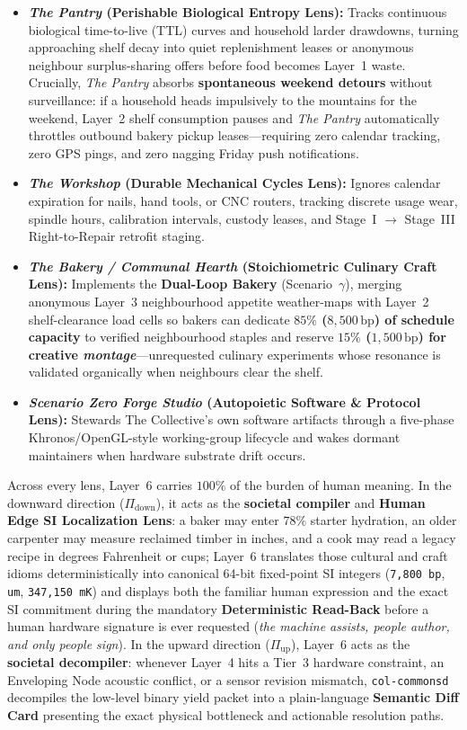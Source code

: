 \begin{itemize}
  \item \textbf{\textit{The Pantry} (Perishable Biological Entropy Lens):} Tracks continuous biological time-to-live (TTL) curves and household larder drawdowns, turning approaching shelf decay into quiet replenishment leases or anonymous neighbour surplus-sharing offers before food becomes Layer~1 waste. Crucially, \textit{The Pantry} absorbs \textbf{spontaneous weekend detours} without surveillance: if a household heads impulsively to the mountains for the weekend, Layer~2 shelf consumption pauses and \textit{The Pantry} automatically throttles outbound bakery pickup leases---requiring zero calendar tracking, zero GPS pings, and zero nagging Friday push notifications.
  \item \textbf{\textit{The Workshop} (Durable Mechanical Cycles Lens):} Ignores calendar expiration for nails, hand tools, or CNC routers, tracking discrete usage wear, spindle hours, calibration intervals, custody leases, and Stage~I $\to$ Stage~III Right-to-Repair retrofit staging.
  \item \textbf{\textit{The Bakery / Communal Hearth} (Stoichiometric Culinary Craft Lens):} Implements the \textbf{Dual-Loop Bakery} (Scenario~$\gamma$), merging anonymous Layer~3 neighbourhood appetite weather-maps with Layer~2 shelf-clearance load cells so bakers can dedicate \textbf{$85\%$ ($8{,}500\,\mathrm{bp}$) of schedule capacity} to verified neighbourhood staples and reserve \textbf{$15\%$ ($1{,}500\,\mathrm{bp}$) for creative \textit{montage}}---unrequested culinary experiments whose resonance is validated organically when neighbours clear the shelf.
  \item \textbf{\textit{Scenario Zero Forge Studio} (Autopoietic Software \& Protocol Lens):} Stewards The Collective's own software artifacts through a five-phase Khronos/OpenGL-style working-group lifecycle and wakes dormant maintainers when hardware substrate drift occurs.
\end{itemize}

Across every lens, Layer~6 carries $100\%$ of the burden of human meaning. In the downward direction ($\Pi_{\mathrm{down}}$), it acts as the \textbf{societal compiler} and \textbf{Human Edge SI Localization Lens}: a baker may enter $78\%$ starter hydration, an older carpenter may measure reclaimed timber in inches, and a cook may read a legacy recipe in degrees Fahrenheit or cups; Layer~6 translates those cultural and craft idioms deterministically into canonical 64-bit fixed-point SI integers (\texttt{7,800 bp}, \texttt{um}, \texttt{347,150 mK}) and displays both the familiar human expression and the exact SI commitment during the mandatory \textbf{Deterministic Read-Back} before a human hardware signature is ever requested (\textit{the machine assists, people author, and only people sign}). In the upward direction ($\Pi_{\mathrm{up}}$), Layer~6 acts as the \textbf{societal decompiler}: whenever Layer~4 hits a Tier~3 hardware constraint, an Enveloping Node acoustic conflict, or a sensor revision mismatch, \texttt{col-commonsd} decompiles the low-level binary yield packet into a plain-language \textbf{Semantic Diff Card} presenting the exact physical bottleneck and actionable resolution paths.

